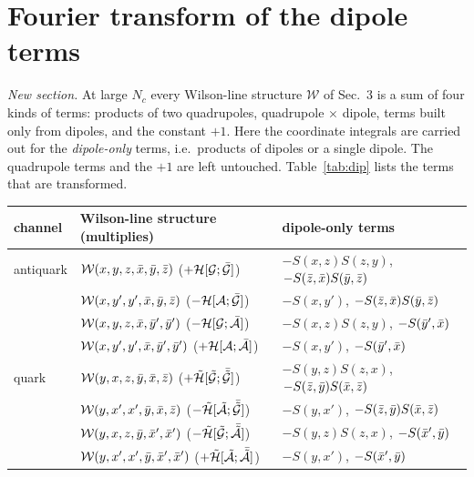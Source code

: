 \documentclass[9pt]{article}
\numberwithin{equation}{section}
\begin{document}
\section{Fourier transform of the dipole terms}\label{sec:FT}
\noindent\textit{New section.} At large $N_{c}$ every Wilson-line structure $\mathcal{W}$ of Sec.~3 is a sum of four kinds of terms: products of two quadrupoles, quadrupole $\times$ dipole, terms built only from dipoles, and the constant $+1$. Here the coordinate integrals are carried out for the \emph{dipole-only} terms, i.e.\ products of dipoles or a single dipole. The quadrupole terms and the $+1$ are left untouched. Table~\ref{tab:dip} lists the terms that are transformed.
\begin{table}[h!]
\centering
\renewcommand{\arraystretch}{1.25}
\begin{tabular}{||l|l|l||}
\hline
channel & Wilson-line structure (multiplies) & dipole-only terms \\
\hline\hline
antiquark & $\mathcal{W}(x,y,z,\Bar{x},\Bar{y},\Bar{z})$ \hfill ($+\mathcal{H}[\mathcal{G};\Bar{\mathcal{G}}]$) & $-S(x,z)S(z,y)$, \quad $-S(\Bar{z},\Bar{x})S(\Bar{y},\Bar{z})$ \\
 & $\mathcal{W}(x,y',y',\Bar{x},\Bar{y},\Bar{z})$ \hfill ($-\mathcal{H}[\mathcal{A};\Bar{\mathcal{G}}]$) & $-S(x,y')$, \quad $-S(\Bar{z},\Bar{x})S(\Bar{y},\Bar{z})$ \\
 & $\mathcal{W}(x,y,z,\Bar{x},\Bar{y}',\Bar{y}')$ \hfill ($-\mathcal{H}[\mathcal{G};\Bar{\mathcal{A}}]$) & $-S(x,z)S(z,y)$, \quad $-S(\Bar{y}',\Bar{x})$ \\
 & $\mathcal{W}(x,y',y',\Bar{x},\Bar{y}',\Bar{y}')$ \hfill ($+\mathcal{H}[\mathcal{A};\Bar{\mathcal{A}}]$) & $-S(x,y')$, \quad $-S(\Bar{y}',\Bar{x})$ \\
\hline
quark & $\mathcal{W}(y,x,z,\Bar{y},\Bar{x},\Bar{z})$ \hfill ($+\Tilde{\mathcal{H}}[\Tilde{\mathcal{G}};\Bar{\Tilde{\mathcal{G}}}]$) & $-S(y,z)S(z,x)$, \quad $-S(\Bar{z},\Bar{y})S(\Bar{x},\Bar{z})$ \\
 & $\mathcal{W}(y,x',x',\Bar{y},\Bar{x},\Bar{z})$ \hfill ($-\Tilde{\mathcal{H}}[\Tilde{\mathcal{A}};\Bar{\Tilde{\mathcal{G}}}]$) & $-S(y,x')$, \quad $-S(\Bar{z},\Bar{y})S(\Bar{x},\Bar{z})$ \\
 & $\mathcal{W}(y,x,z,\Bar{y},\Bar{x}',\Bar{x}')$ \hfill ($-\Tilde{\mathcal{H}}[\Tilde{\mathcal{G}};\Bar{\Tilde{\mathcal{A}}}]$) & $-S(y,z)S(z,x)$, \quad $-S(\Bar{x}',\Bar{y})$ \\
 & $\mathcal{W}(y,x',x',\Bar{y},\Bar{x}',\Bar{x}')$ \hfill ($+\Tilde{\mathcal{H}}[\Tilde{\mathcal{A}};\Bar{\Tilde{\mathcal{A}}}]$) & $-S(y,x')$, \quad $-S(\Bar{x}',\Bar{y})$ \\

\end{tabular}
\end{table}
\end{document}
